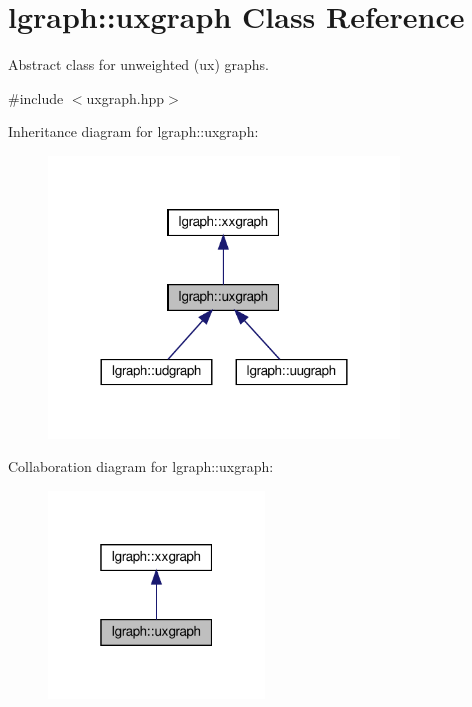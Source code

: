 \hypertarget{classlgraph_1_1uxgraph}{}\section{lgraph\+:\+:uxgraph Class Reference}
\label{classlgraph_1_1uxgraph}


Abstract class for unweighted (ux) graphs.  




{\ttfamily \#include $<$uxgraph.\+hpp$>$}



Inheritance diagram for lgraph\+:\+:uxgraph\+:\nopagebreak
\begin{figure}[H]
\begin{center}
\leavevmode
\includegraphics[width=264pt]{classlgraph_1_1uxgraph__inherit__graph}
\end{center}
\end{figure}


Collaboration diagram for lgraph\+:\+:uxgraph\+:\nopagebreak
\begin{figure}[H]
\begin{center}
\leavevmode
\includegraphics[width=163pt]{classlgraph_1_1uxgraph__coll__graph}
\end{center}
\end{figure}
